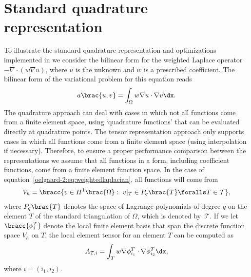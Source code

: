 \section{Standard quadrature representation}
\label{oelgaard-2:sec:standard_quadrature_representation}
%
To illustrate the standard quadrature representation  and optimizations implemented in \ffc{} we consider
the bilinear form for the weighted Laplace operator $-\nabla \cdot (w
\nabla u)$, where $u$ is the unknown and $w$ is a prescribed coefficient.
The bilinear form of the variational problem for this equation reads
%
\begin{equation}
  a\brac{u, v} = \int_{\Omega} w \nabla u \cdot \nabla v \dx.
\label{oelgaard-2:eq:weightedlaplacian}
\end{equation}
%
The quadrature approach can deal with cases in which not all functions
come from a finite element space, using `quadrature functions'
that can be evaluated directly at quadrature points. The tensor
representation approach only supports cases in which all functions
come from a finite element space (using interpolation if necessary).
Therefore, to ensure a proper performance comparison between the
representations we assume that all functions in a form, including
coefficient functions, come from a finite element function space.
In the case of equation~\eqref{oelgaard-2:eq:weightedlaplacian}, all
functions will come from
%
\begin{equation}
  V_{h} = \bracc{v \in H^{1}\brac{\Omega}: \ v\vert_T \in P_{q}\brac{T}
   \foralls T \in \mathcal{T}},
\label{oelgaard-2:eq:space_H1}
\end{equation}
%
where $P_{q}\brac{T}$ denotes the space of Lagrange polynomials of degree
$q$ on the element $T$ of the standard triangulation of $\Omega$, which
is denoted by~$\mathcal{T}$.  If we let $\bracc{\phi^{T}_{i}}$ denote the
local finite element basis that span the discrete function space $V_{h}$
on $T$, the local element tensor for an element $T$ can be computed as
%
\begin{equation}
  A_{T,i} = \int_{T} w \nabla \phi^{T}_{i_1} \cdot \nabla
  \phi^{T}_{i_2} \dx,
\label{oelgaard-2:eq:localtensor}
\end{equation}
%
where $i = (i_{1}, i_{2})$.

